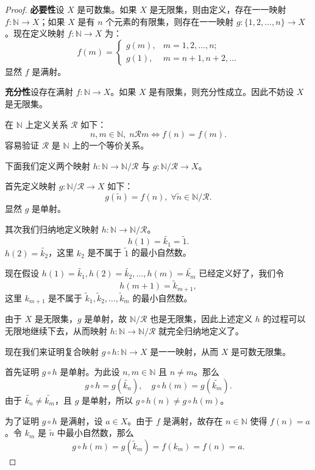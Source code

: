 \begin{proof}
	\textbf{必要性}\quad 设 \(X\) 是可数集。如果 \(X\) 是无限集，则由定义，存在一一映射 \(f: \mathbb{N} \to X\)；如果 \(X\) 是有 \(n\) 个元素的有限集，则存在一一映射 \(g: \{1, 2, \dots, n\} \to X\)。现在定义映射 \(f: \mathbb{N} \to X\) 为：
	\[
	f(m) =
	\begin{cases}
		g(m), & m = 1, 2, \dots, n; \\
		g(1), & m = n+1, n+2, \dots
	\end{cases}
	\]
	显然 \(f\) 是满射。
	
	\textbf{充分性}\quad 设存在满射 \(f: \mathbb{N} \to X\)。如果 \(X\) 是有限集，则充分性成立。因此不妨设 \(X\) 是无限集。
	
	在 \(\mathbb{N}\) 上定义关系 \(\mathscr{R}\) 如下：
	\[
	n, m \in \mathbb{N},\; n \mathscr{R} m \iff f(n) = f(m).
	\]
	容易验证 \(\mathscr{R}\) 是 \(\mathbb{N}\) 上的一个等价关系。
	
	下面我们定义两个映射 \(h: \mathbb{N} \to \mathbb{N}/\mathscr{R}\) 与 \(g: \mathbb{N}/\mathscr{R} \to X\)。
	
	首先定义映射 \(g: \mathbb{N}/\mathscr{R} \to X\) 如下：
	\[
	g(\tilde{n}) = f(n),\; \forall \tilde{n} \in \mathbb{N}/\mathscr{R}.
	\]
	显然 \(g\) 是单射。
	
	其次我们归纳地定义映射 \(h: \mathbb{N} \to \mathbb{N}/\mathscr{R}\)。
	\[
	h(1) = \widetilde{k_1} = \widetilde{1}.
	\]
	\(h(2) = \widetilde{k_2}\)，这里 \(k_2\) 是不属于 \(\widetilde{1}\) 的最小自然数。
	
	现在假设 \(h(1) = \widetilde{k_1}, h(2) = \widetilde{k_2}, \dots, h(m) = \widetilde{k_m}\) 已经定义好了，我们令
	\[
	h(m+1) = \widetilde{k}_{m+1},
	\]
	这里 \(k_{m+1}\) 是不属于 \(\widetilde{k}_1, \widetilde{k}_2, \dots, \widetilde{k}_m\) 的最小自然数。
	
	由于 \(X\) 是无限集，\(g\) 是单射，故 \(\mathbb{N}/\mathscr{R}\) 也是无限集，因此上述定义 \(h\) 的过程可以无限地继续下去，从而映射 \(h: \mathbb{N} \to \mathbb{N}/\mathscr{R}\) 就完全归纳地定义了。
	
	现在我们来证明复合映射 \(g \circ h: \mathbb{N} \to X\) 是一一映射，从而 \(X\) 是可数无限集。
	
	首先证明 \(g \circ h\) 是单射。为此设 \(n, m \in \mathbb{N}\) 且 \(n \neq m\)。那么
	\[
	g \circ h = g(\widetilde{k_n}),\quad g \circ h(m) = g(\widetilde{k_m}).
	\]
	由于 \(\widetilde{k_n} \neq \widetilde{k_m}\)，且 \(g\) 是单射，所以 \(g \circ h(n) \neq g \circ h(m)\)。
	
	为了证明 \(g \circ h\) 是满射，设 \(a \in X\)。由于 \(f\) 是满射，故存在 \(n \in \mathbb{N}\) 使得 \(f(n) = a\)。令 \(k_m\) 是 \(\tilde{n}\) 中最小自然数，那么
	\[
	g \circ h(m) = g(\tilde{k}_m) = f(k_m) = f(n) = a.
	\]
\end{proof}

